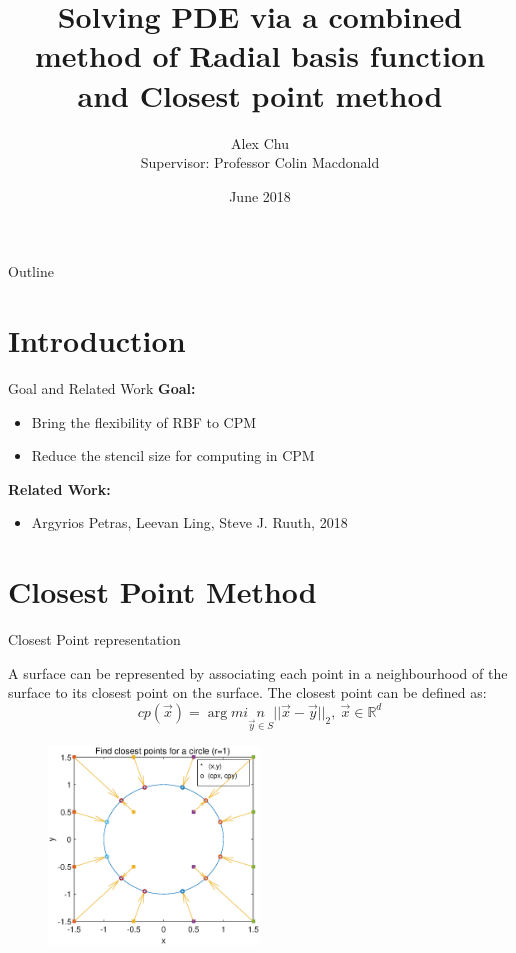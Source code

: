 \documentclass{beamer}
\title{Solving PDE via a combined method of Radial basis function and Closest point method}
\date{June 2018}
\author{Alex Chu\\ \footnotesize Supervisor: Professor Colin Macdonald}
\institute{University of British Columbia}
\begin{document}
\maketitle

\begin{frame}{Outline}
    \tableofcontents
\end{frame}

\section{Introduction}

\begin{frame}{Goal and Related Work}
    \textbf{Goal:}
    \begin{itemize}
        \item  Bring the flexibility of RBF to CPM
        \item  Reduce the stencil size for computing in CPM
    \end{itemize}
    \textbf{Related Work:}
    \begin{itemize}
        \item Argyrios Petras, Leevan Ling, Steve J. Ruuth, 2018 
    \end{itemize}
\end{frame}

\section{Closest Point Method}

\begin{frame}{Closest Point representation}

    A surface can be represented by associating each point in a neighbourhood of the surface to its closest point on the surface. The closest point can be defined as:
    $$cp(\vec{x}) = \arg min \limits_{\vec{y}\in S} ||\vec{x}-\vec{y}||_2,\ \vec{x}\in\mathbb{R}^d $$
    
    \pause
    
    \begin{figure}
            \centering
            \includegraphics[width=0.5\textwidth]{UBC_IAM_5min_talk/Figures/Resultcp.eps}
        \end{figure}
    
\end{frame}
\end{document}
